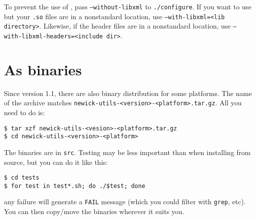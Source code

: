 \noindent{}To prevent the use of \libxml, pass \texttt{--without-libxml} to
\texttt{./configure}. If you want to use \libxml{} but your \texttt{.so} files
are in a nonstandard location, use \texttt{--with-libxml=<lib directory>}.
Likewise, if the \libxml{} header files are in a nonstandard location, use
\texttt{--with-libxml-headers=<include dir>}.

\section{As binaries}

Since version 1.1, there are also binary distribution for some platforms. The
name of the archive matches \texttt{newick-utils-<version>-<platform>.tar.gz}.
All you need to do is:

\begin{verbatim}
$ tar xzf newick-utils-<vesion>-<platform>.tar.gz
$ cd newick-utils-<version>-<platform>
\end{verbatim}

\noindent{}The binaries are in \texttt{src}. Testing may be less important than
when installing from source, but you can do it like this:

\begin{verbatim}
$ cd tests
$ for test in test*.sh; do ./$test; done 
\end{verbatim}

\noindent{}any failure will generate a \texttt{FAIL} message (which you could filter with \texttt{grep}, etc).  You can then copy/move the binaries wherever it suits you.

